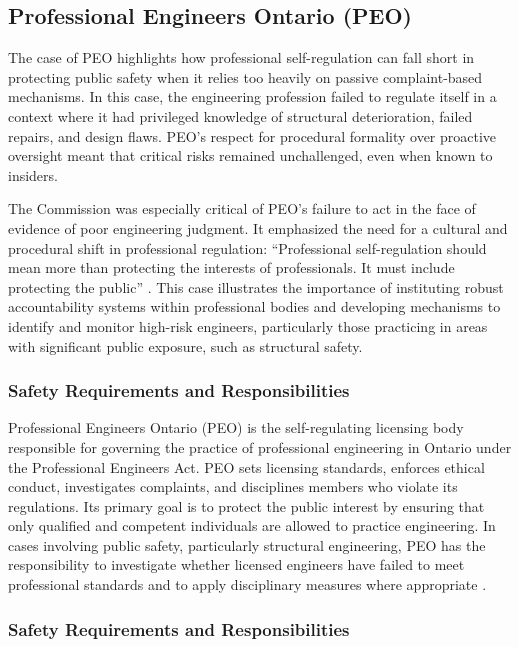 \documentclass[12pt]{article}
\begin{document}
\subsection{Professional Engineers Ontario (PEO)}
The case of PEO highlights how professional self-regulation can fall short in protecting public safety when it relies too heavily on passive complaint-based mechanisms. In this case, the engineering profession failed to regulate itself in a context where it had privileged knowledge of structural deterioration, failed repairs, and design flaws. PEO's respect for procedural formality over proactive oversight meant that critical risks remained unchallenged, even when known to insiders.

The Commission was especially critical of PEO's failure to act in the face of evidence of poor engineering judgment. It emphasized the need for a cultural and procedural shift in professional regulation: ``Professional self-regulation should mean more than protecting the interests of professionals. It must include protecting the public'' \cite[p395]{AlgoLakeReport1}. This case illustrates the importance of instituting robust accountability systems within professional bodies and developing mechanisms to identify and monitor high-risk engineers, particularly those practicing in areas with significant public exposure, such as structural safety.

\subsubsection*{Safety Requirements and Responsibilities}

Professional Engineers Ontario (PEO) is the self-regulating licensing body responsible for governing the practice of professional engineering in Ontario under the Professional Engineers Act. PEO sets licensing standards, enforces ethical conduct, investigates complaints, and disciplines members who violate its regulations. Its primary goal is to protect the public interest by ensuring that only qualified and competent individuals are allowed to practice engineering. In cases involving public safety, particularly structural engineering, PEO has the responsibility to investigate whether licensed engineers have failed to meet professional standards and to apply disciplinary measures where appropriate \cite[p393-394]{AlgoLakeReport1}.

\subsubsection*{Safety Requirements and Responsibilities}
\end{document}
